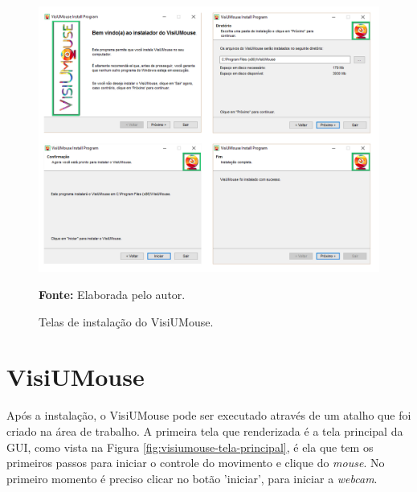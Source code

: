 \begin{figure}[H]
\caption{Telas de instalação do VisiUMouse.} 
\centering \includegraphics[scale=0.45]{img/software-instalador.png}

{\fontsize{11}{11}\selectfont \textbf{Fonte:} Elaborada pelo autor.}
\label{fig:visiumouse-instalador}
\end{figure}

\section{VisiUMouse}
Após a instalação, o VisiUMouse pode ser executado através de um atalho que foi criado na área de trabalho. A primeira tela que renderizada é a tela principal da GUI, como vista na Figura \ref{fig:visiumouse-tela-principal}, é ela que tem os primeiros passos para iniciar o controle do movimento e clique do \textit{mouse}. No primeiro momento é preciso clicar no botão 'iniciar', para iniciar a \textit{webcam}.

